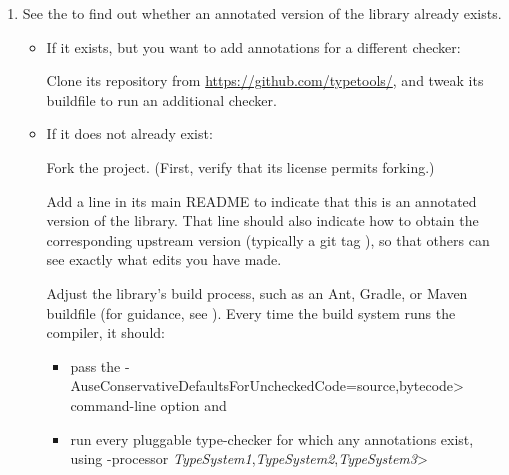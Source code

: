 \begin{enumerate}
\item See the
  to find out whether an annotated version of the library already exists.

  \begin{itemize}
  \item
    If it exists, but you want to add annotations for a different checker:

    Clone its repository from \url{https://github.com/typetools/}, and tweak
    its buildfile to run an additional checker.

  \item
    If it does not already exist:

    Fork the project.  (First, verify that its license permits forking.)

    Add a line in its main README to indicate that this is an annotated
    version of the library.  That line should also indicate how to obtain
    the corresponding upstream version (typically a git tag
    ), so that others can see exactly what edits you have
    made.

  Adjust the library's
  build process, such as an Ant, Gradle, or Maven buildfile (for guidance,
  see ).
    Every time the build system runs the compiler, it should:
    \begin{itemize}
    \item
      pass the \<-AuseConservativeDefaultsForUncheckedCode=source,bytecode>
      command-line option and
    \item
      run every pluggable type-checker for which any
      annotations exist, using \<-processor
      \emph{TypeSystem1},\emph{TypeSystem2},\emph{TypeSystem3}>
    \end{itemize}


\end{itemize}
\end{enumerate}
